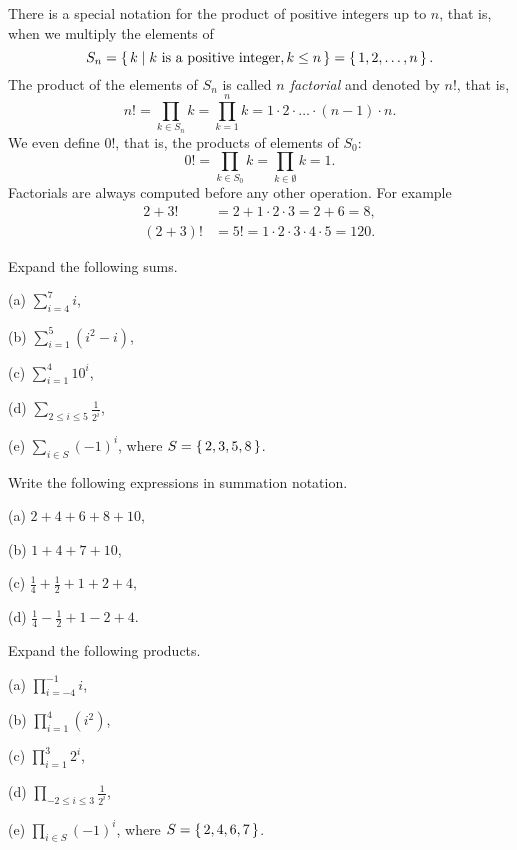 There is a special notation for the product of positive integers up to $n$, 
that is, when we multiply the elements of 
\[
S_n = \left\{\,k\mid k \text{ is a positive integer}, k\leq n\,\right\} = \left\{\,1, 2, \dots , n\,\right\}. 
\]
The product of the elements of $S_n$ is called \emph{$n$ factorial} and denoted by $n!$, 
that is, 
\[
n! = \prod_{k \in S_n} k = \prod_{k=1}^n k = 1 \cdot 2 \cdot \dots \cdot (n-1) \cdot n. 
\]
We even define $0!$, 
that is, the products of elements of $S_0$: 
\[
0! = \prod_{k \in S_0} k = \prod_{k \in \emptyset} k = 1.
\]
Factorials are always computed before any other operation. 
For example
\begin{align*}
2+3! &= 2 + 1\cdot 2 \cdot 3 = 2 + 6 = 8, \\
(2+3)! &= 5! = 1\cdot 2 \cdot 3 \cdot 4 \cdot 5 = 120. 
\end{align*}



\begin{exercise}\label{intro-ex-9}
Expand the following sums.

(a) $\sum_{i=4}^7 i$,

(b) $\sum_{i=1}^5 (i^2-i)$,

(c) $\sum_{i=1}^4 10^i$,

(d) $\sum_{2\leq i\leq 5} \frac{1}{2^i}$,

(e) $\sum_{i\in S} (-1)^i$, where $S=\left\{\,2,3,5,8\,\right\}$.
\end{exercise}

\begin{exercise}\label{intro-ex-10}
Write the following expressions in summation notation.

(a) $2+4+6+8+10$,

(b) $1+4+7+10$,

(c) $\frac{1}{4}+\frac{1}{2}+1+2+4$,

(d) $\frac{1}{4}-\frac{1}{2}+1-2+4$.
\end{exercise}

\begin{exercise}\label{intro-ex-11}
Expand the following products.

(a) $\prod_{i=-4}^{-1} i$,

(b) $\prod_{i=1}^4 (i^2)$,

(c) $\prod_{i=1}^3 2^i$,

(d) $\prod_{-2\leq i\leq 3} \frac{1}{2^i}$,

(e) $\prod_{i\in S} (-1)^i$, where $S=\left\{\,2,4,6,7\,\right\}$. 
\end{exercise}

